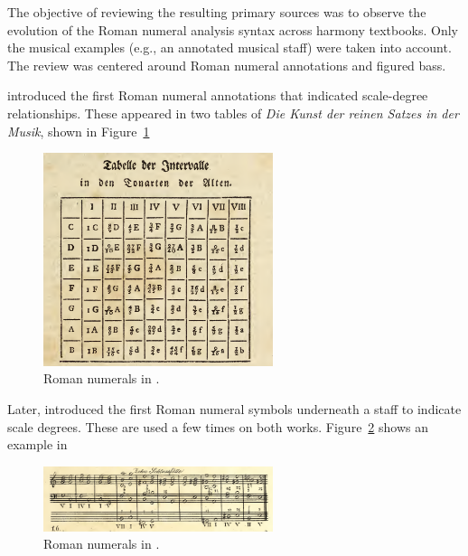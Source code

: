 The objective of reviewing the resulting primary sources was to observe the evolution of the Roman numeral analysis syntax across harmony textbooks.
Only the musical examples (e.g., an annotated musical staff) were taken into account.
The review was centered around Roman numeral annotations and figured bass.

\textcite{kirnberger1774kunst} introduced the first Roman numeral annotations that indicated scale-degree relationships.
These appeared in two tables of \emph{Die Kunst der reinen Satzes in der Musik}, shown in Figure~\ref{fig:kirnberger1774kunst015}

\begin{figure}[h!]
    \centering
    \includegraphics[width=0.6\textwidth]{figures/chapter/2/primary_sources/kirnberger1774kunst015.png}
    \caption{Roman numerals in \textcite{kirnberger1774kunst}.}
    \label{fig:kirnberger1774kunst015}
\end{figure}

Later, \textcite{vogler1778grunde, vogler1802handbuch} introduced the first Roman numeral symbols underneath a staff to indicate scale degrees.
These are used a few times on both works.
Figure~\ref{fig:vogler1778grunde021} shows an example in \textcite{vogler1778grunde}

\begin{figure}[h!]
    \centering
    \includegraphics[width=0.6\textwidth]{figures/chapter/2/primary_sources/vogler1778grunde021.png}
    \caption{Roman numerals in \textcite{vogler1778grunde}.}
    \label{fig:vogler1778grunde021}
\end{figure}


